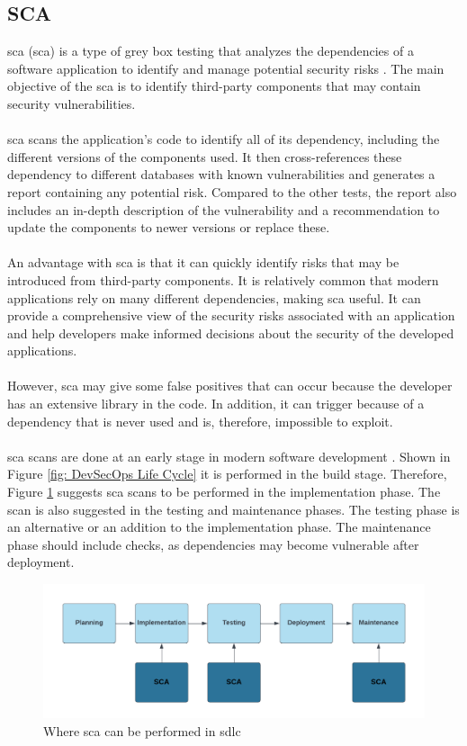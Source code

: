 \subsection{SCA}
\acrlong{sca} (\acrshort{sca}) is a type of grey box testing that analyzes the dependencies of a software application to identify and manage potential security risks \cite{sca}. The main objective of the \acrshort{sca} is to identify third-party components that may contain security vulnerabilities. 
\\~\\
\acrshort{sca} scans the application's code to identify all of its \gls{dependency}, including the different versions of the components used. It then cross-references these \gls{dependency} to different databases with known vulnerabilities and generates a report containing any potential risk. Compared to the other tests, the report also includes an in-depth description of the vulnerability and a recommendation to update the components to newer versions or replace these. 
\\~\\
An advantage with \acrshort{sca} is that it can quickly identify risks that may be introduced from third-party components. It is relatively common that modern applications rely on many different dependencies, making \acrshort{sca} useful. It can provide a comprehensive view of the security risks associated with an application and help developers make informed decisions about the security of the developed applications. 
\\~\\
However, \acrshort{sca} may give some false positives that can occur because the developer has an extensive library in the code. In addition, it can trigger because of a dependency that is never used and is, therefore, impossible to exploit.
\\~\\
\acrshort{sca} scans are done at an early stage in modern software development \cite{sca}. Shown in Figure \ref{fig: DevSecOps Life Cycle} it is performed in the build stage. Therefore, Figure \ref{fig: Where SCA can be performed in SDLC} suggests \acrshort{sca} scans to be performed in the implementation phase. The scan is also suggested in the testing and maintenance phases. The testing phase is an alternative or an addition to the implementation phase. The maintenance phase should include checks, as dependencies may become vulnerable after deployment.

\vspace{2mm}
\begin{figure}[H]
    \centering
    \includegraphics[width=0.8\columnwidth]{Images/sca.png}
    \caption{Where \acrshort{sca} can be performed in \acrshort{sdlc}} 
    \label{fig: Where SCA can be performed in SDLC}
\end{figure}

